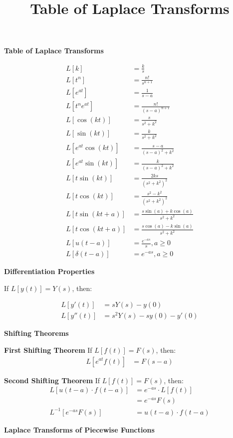 \documentclass[10pt]{article}
\title{Table of Laplace Transforms}
\begin{document}
\begin{multicols}{2}
\textbf{Table of Laplace Transforms}

\begin{align}
  L[k] &= \frac{k}{s} \\
  L[t^n] &= \frac{n!}{s^{n+1}} \\
  L[e^{at}] &= \frac{1}{s - a}\\
  L[t^n e^{at}] &= \frac{n!}{(s-a)^{n+1}} \\
  L[\cos(kt)] &= \frac{s}{s^2 + k^2} \\
  L[\sin(kt)] &= \frac{k}{s^2 + k^2} \\
  L[e^{at} \cos(kt)] &= \frac{s - a}{(s - a)^2 + k^2} \\
  L[e^{at} \sin(kt)] &= \frac{k}{(s - a)^2 + k^2} \\
  L[t \sin(kt)] &= \frac{2ks}{(s^2 + k^2)^2} \\
  L[t \cos(kt)] &= \frac{s^2 - k^2}{(s^2 + k^2)^2}\\
  L[t \sin(kt+a)] &= \frac{s\sin(a) + k \cos(a)}{s^2 + k^2} \\
  L[t \cos(kt + a)] &= \frac{s \cos(a) - k \sin(a)}{s^2 + k^2} \\
  L[u(t-a)] &= \frac{e^{-as}}{s}, a \geq 0 \\
  L[\delta(t-a)] &= e^{-as}, a \geq 0
\end{align}

\textbf{Differentiation Properties}

If \( L[y(t)] = Y(s) \), then:

\begin{align}
  L[y'(t)] &= sY(s) - y(0) \\
  L[y''(t)] &= s^2 Y(s) - sy(0) - y'(0)
\end{align}

\textbf{Shifting Theorems}

\textbf{First Shifting Theorem}
If \( L[f(t)] = F(s) \), then:
\begin{align}
  L[e^{at} f(t)] &= F(s - a)
\end{align}

\textbf{Second Shifting Theorem}
If \( L[f(t)] = F(s) \), then:
\begin{align}
  L[u(t - a) \cdot f(t - a)] &= e^{-as} \cdot L[f(t)] \\
  &= e^{-as} F(s) \\
  L^{-1}[e^{-as} F(s)] &= u(t - a) \cdot f(t - a)
\end{align}

\textbf{Laplace Transforms of Piecewise Functions}


\end{multicols}
\end{document}
